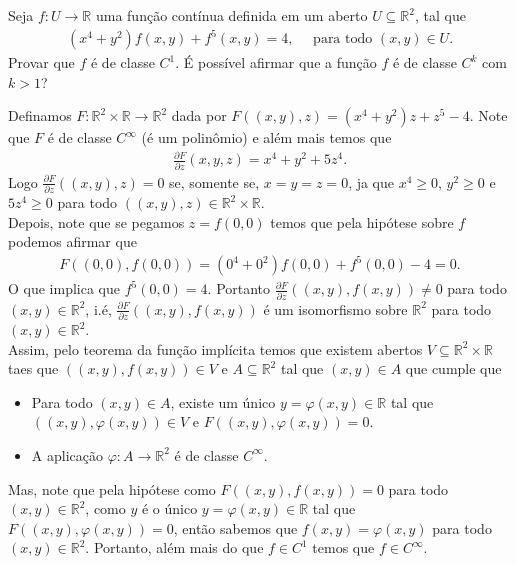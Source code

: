 \begin{homeworkProblem}[Seção 2-3]
  Seja $f:U\to\mathbb{R}$ uma função contínua definida em um aberto $U\subseteq \mathbb{R}^{2}$, tal que
  \begin{align*}
    (x^{4}+y^{2})f(x,y)+f^{5}(x,y)=4,\quad\text{ para todo }(x,y)\in U.
  \end{align*}
  Provar que $f$ é de classe $C^{1}$. É possível afirmar que a função $f$ é de classe $C^{k}$ com $k>1$? 
  \begin{solution}
    Definamos $F:\mathbb{R}^{2}\times\mathbb{R}\to\mathbb{R}^{2}$ dada por $F((x,y),z)=(x^{4}+y^{2})z+z^{5}-4$. Note que $F$ é de classe $C^{\infty}$ (é um polinômio) e além mais temos que
    \begin{align*}
      \frac{\partial F}{\partial z}(x,y,z)=x^{4}+y^{2}+5z^{4}.
    \end{align*}
    Logo $\frac{\partial F}{\partial z}((x,y),z)=0$ se, somente se, $x=y=z=0$, ja que $x^{4}\geq 0$, $y^{2}\geq 0$ e $5z^{4}\geq 0$ para todo $((x,y),z)\in\mathbb{R}^{2}\times\mathbb{R}$.\\
    Depois, note que se pegamos $z=f(0,0)$ temos que pela hipótese sobre $f$ podemos afirmar que 
    \begin{align*}
      F((0,0),f(0,0))=(0^{4}+0^{2})f(0,0)+f^{5}(0,0)-4=0.
    \end{align*}
    O que implica que $f^{5}(0,0)=4$. Portanto $\frac{\partial F}{\partial z}((x,y),f(x,y))\neq 0$ para todo $(x,y)\in\mathbb{R}^{2}$, i.é, $\frac{\partial F}{\partial z}((x,y),f(x,y))$ é um isomorfismo sobre $\mathbb{R}^{2}$ para todo $(x,y)\in \mathbb{R}^{2}$.\\
    Assim, pelo teorema da função implícita temos que existem abertos $V\subseteq\mathbb{R}^{2}\times\mathbb{R}$ taes que $((x,y),f(x,y))\in V$ e $A\subseteq \mathbb{R}^{2}$ tal que $(x,y)\in A$ que cumple que
    \begin{itemize}
      \item Para todo $(x,y)\in A$, existe um único $y=\varphi(x,y)\in\mathbb{R}$ tal que $((x,y),\varphi(x,y))\in V$ e $F((x,y),\varphi(x,y))=0$.
      \item A aplicação $\varphi:A\to\mathbb{R}^{2}$ é de classe $C^{\infty}$. 
    \end{itemize}
    Mas, note que pela hipótese como $F((x,y),f(x,y))=0$ para todo $(x,y)\in\mathbb{R}^{2}$, como $y$ é o único $y=\varphi(x,y)\in\mathbb{R}$ tal que $F((x,y),\varphi(x,y))=0$, então sabemos que $f(x,y)=\varphi(x,y)$ para todo $(x,y)\in\mathbb{R}^{2}$. Portanto, além mais do que $f\in C^{1}$ temos que $f\in C^{\infty}$.
  \end{solution}
\end{homeworkProblem}
